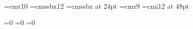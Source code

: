 
\font\mainfont=cmr10
\font\chheadfont=cmssbx12
\font\bkheadfont=cmssbx at 24pt
\font\numbers=cmr9
\font\titlefont=cmi12 at 48pt

=0
=0
=0